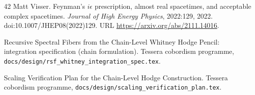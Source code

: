 \documentclass[11pt,letterpaper]{article}
\begin{document}
\begin{thebibliography}{42}
Matt Visser.
Feynman's $i\epsilon$ prescription, almost real spacetimes, and acceptable
complex spacetimes.
\emph{Journal of High Energy Physics}, 2022:129, 2022.
doi:10.1007/JHEP08(2022)129.
URL \url{https://arxiv.org/abs/2111.14016}.

Recursive Spectral Fibers from the Chain-Level Whitney Hodge Pencil:
integration specification (chain formulation). Tessera cobordism programme,
\texttt{docs/design/rsf\_whitney\_integration\_spec.tex}.

Scaling Verification Plan for the Chain-Level Hodge Construction. Tessera
cobordism programme, \texttt{docs/design/scaling\_verification\_plan.tex}.

\end{thebibliography}
\end{document}
